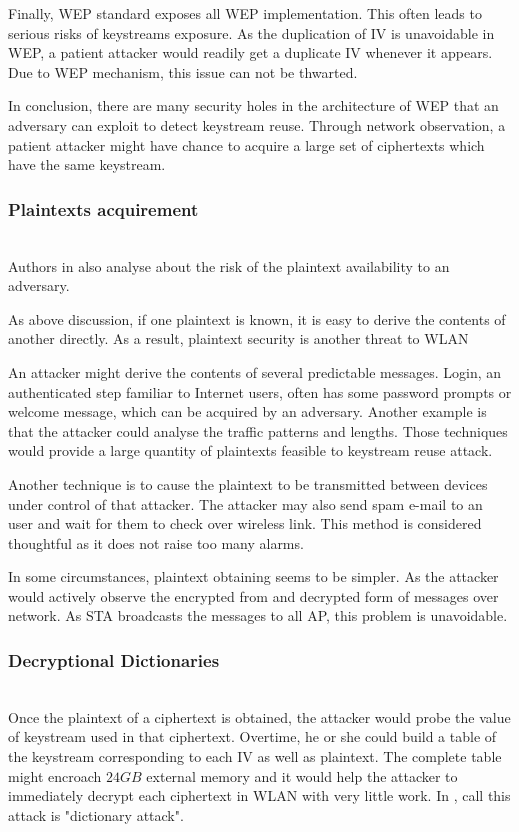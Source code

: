 Finally, \ac{WEP} standard exposes all \ac{WEP} implementation. This often leads to serious risks of keystreams exposure. As the duplication of \ac{IV} is unavoidable in \ac{WEP}, a patient attacker would readily get a duplicate \ac{IV} whenever it appears. Due to \ac{WEP} mechanism, this issue can not be thwarted.

In conclusion, there are many security holes in the architecture of \ac{WEP} that an adversary can exploit to detect keystream reuse. Through network observation, a patient attacker might have chance to acquire a large set of ciphertexts which have the same keystream.

\subsubsection{Plaintexts acquirement}~\\
Authors in \cite{borisov2001intercepting} also analyse about the risk of the plaintext availability to an adversary.

As above discussion, if one plaintext is known, it is easy to derive the contents of another directly. As a result, plaintext security is another threat to \ac{WLAN}

An attacker might derive the contents of several predictable messages. Login, an authenticated step familiar to Internet users, often has some password prompts or welcome message, which can be acquired by an adversary. Another example is that the attacker could analyse the traffic patterns and lengths. Those techniques would provide a large quantity of plaintexts feasible to keystream reuse attack.

Another technique is to cause the plaintext to be transmitted between devices under control of that attacker. The attacker may also send spam e-mail to an user and wait for them to check over wireless link. This method is considered thoughtful as it does not raise too many alarms.

In some circumstances, plaintext obtaining seems to be simpler. As the attacker would actively observe the encrypted from and decrypted form of messages over network. As \ac{STA} broadcasts the messages to all \ac{AP}, this problem is unavoidable.

\subsubsection{Decryptional Dictionaries}~\\
Once the plaintext of a ciphertext is obtained, the attacker would probe the value of keystream used in that ciphertext. Overtime, he or she could build a table of the keystream corresponding to each \ac{IV} as well as plaintext. The complete table might encroach $24GB$ external memory and it would help the attacker to immediately decrypt each ciphertext in \ac{WLAN} with very little work. In \cite{al2006ieee}, \citeauthor{al2006ieee} call this attack is "dictionary attack".



